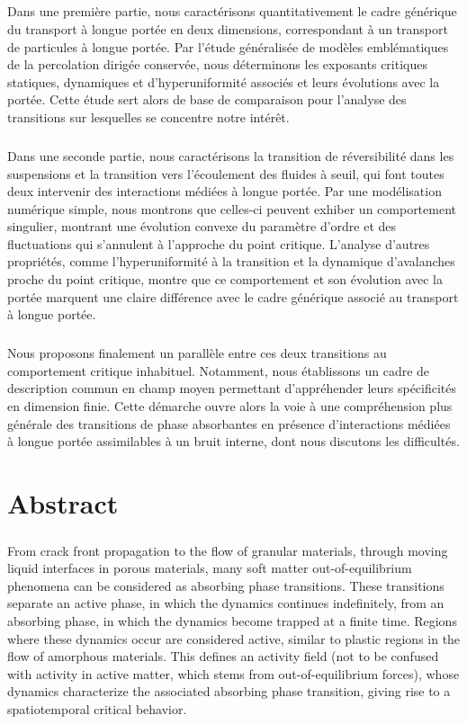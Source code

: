 \subparagraph{}Dans une première partie, nous caractérisons quantitativement le cadre générique du transport à longue portée en deux dimensions, correspondant à un transport de particules à longue portée. Par l'étude généralisée de modèles emblématiques de la percolation dirigée conservée, nous déterminons les exposants critiques statiques, dynamiques et d'hyperuniformité associés et leurs évolutions avec la portée. Cette étude sert alors de base de comparaison pour l'analyse des transitions sur lesquelles se concentre notre intérêt.

\subparagraph{}Dans une seconde partie, nous caractérisons la transition de réversibilité dans les suspensions et la transition vers l’écoulement des fluides à seuil, qui font toutes deux intervenir des interactions médiées à longue portée.  Par une modélisation numérique simple, nous montrons que celles-ci peuvent exhiber un comportement singulier, montrant une évolution convexe du paramètre d'ordre et des fluctuations qui s'annulent à l'approche du point critique. L'analyse d'autres propriétés, comme l'hyperuniformité à la transition et la dynamique d'avalanches proche du point critique, montre que ce comportement et son évolution avec la portée marquent une claire différence avec le cadre générique associé au transport à longue portée. 

\subparagraph{}Nous proposons finalement un parallèle entre ces deux transitions au comportement critique inhabituel. Notamment, nous établissons un cadre de description commun en champ moyen permettant d'appréhender leurs spécificités en dimension finie. Cette démarche ouvre alors la voie à une compréhension plus générale des transitions de phase absorbantes en présence d'interactions médiées à longue portée assimilables à un bruit interne, dont nous discutons les difficultés.

\vfill

\thispagestyle{empty}

\section*{Abstract}

\subparagraph{}From crack front propagation to the flow of granular materials, through moving liquid interfaces in porous materials, many soft matter out-of-equilibrium phenomena can be considered as absorbing phase transitions. These transitions separate an active phase, in which the dynamics continues indefinitely, from an absorbing phase, in which the dynamics become trapped at a finite time. Regions where these dynamics occur are considered active, similar to plastic regions in the flow of amorphous materials. This defines an activity field (not to be confused with activity in active matter, which stems from out-of-equilibrium forces), whose dynamics characterize the associated absorbing phase transition, giving rise to a spatiotemporal critical behavior.

